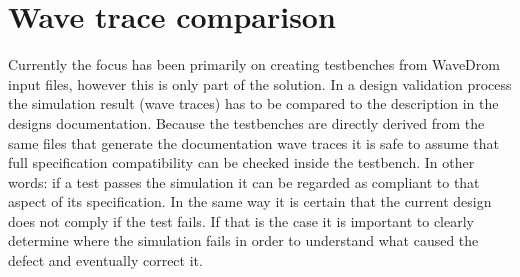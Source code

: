 \section{Wave trace comparison}
Currently the focus has been primarily on creating testbenches from WaveDrom input files, however this is only part of the solution. In a design validation process the simulation result (wave traces) has to be compared to the description in the designs documentation.
\npar
Because the testbenches are directly derived from the same files that generate the documentation wave traces it is safe to assume that full specification compatibility can be checked inside the testbench. In other words: if a test passes the simulation it can be regarded as compliant to that aspect of its specification. In the same way it is certain that the current design does not comply if the test fails. If that is the case it is important to clearly determine where the simulation fails in order to understand what caused the defect and eventually correct it.
